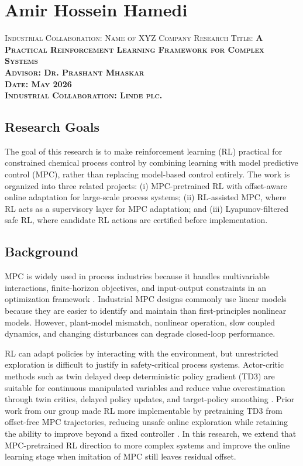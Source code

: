 \documentclass[10pt]{article}
\newcommand{\MySection}[1]{\section*{#1}}
\newcommand{\ResearchGoals}{\subsection*{Research Goals}}
\newcommand{\Background}{\subsection*{Background}}
\newcommand{\tabs}{\>}
\begin{document}
\MySection{Amir Hossein Hamedi}

\begin{tabbing}
  \scshape{Industrial Collaboration}: \= Name of XYZ Company  \kill
  \scshape{Research Title}:           \tabs  \bfseries{A Practical Reinforcement Learning Framework for Complex Systems}  \\
  \scshape{Advisor}:                  \tabs  Dr. Prashant Mhaskar \\
  \scshape{Date}:                     \tabs  May 2026 \\
  \scshape{Industrial Collaboration}: \tabs  Linde plc.
\end{tabbing}

\ResearchGoals

The goal of this research is to make reinforcement learning (RL) practical for constrained chemical process control by combining learning with model predictive control (MPC), rather than replacing model-based control entirely. The work is organized into three related projects: (i) MPC-pretrained RL with offset-aware online adaptation for large-scale process systems; (ii) RL-assisted MPC, where RL acts as a supervisory layer for MPC adaptation; and (iii) Lyapunov-filtered safe RL, where candidate RL actions are certified before implementation.

\Background

MPC is widely used in process industries because it handles multivariable interactions, finite-horizon objectives, and input-output constraints in an optimization framework \cite{rawlings2017mpc}. Industrial MPC designs commonly use linear models because they are easier to identify and maintain than first-principles nonlinear models. However, plant-model mismatch, nonlinear operation, slow coupled dynamics, and changing disturbances can degrade closed-loop performance.

RL can adapt policies by interacting with the environment, but unrestricted exploration is difficult to justify in safety-critical process systems. Actor-critic methods such as twin delayed deep deterministic policy gradient (TD3) are suitable for continuous manipulated variables and reduce value overestimation through twin critics, delayed policy updates, and target-policy smoothing \cite{fujimoto2018td3}. Prior work from our group made RL more implementable by pretraining TD3 from offset-free MPC trajectories, reducing unsafe online exploration while retaining the ability to improve beyond a fixed controller \cite{hassanpour2024practically}. In this research, we extend that MPC-pretrained RL direction to more complex systems and improve the online learning stage when imitation of MPC still leaves residual offset.
\end{document}

